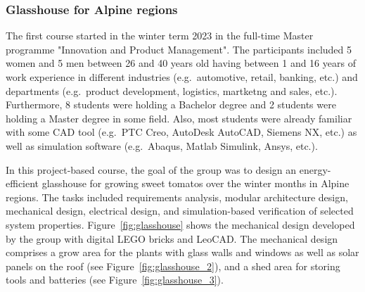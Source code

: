 \documentclass{PDS}
\begin{document}
\subsubsection{Glasshouse for Alpine regions}
\label{sec:master-product-lego}

The first course started in the winter term 2023 in the full-time Master programme "Innovation and Product Management".
The participants included 5 women and 5 men between 26 and 40 years old having between 1 and 16 years of work experience in different industries (e.g.\ automotive, retail, banking, etc.) and departments (e.g.\ product development, logistics, martketng and sales, etc.).
Furthermore, 8 students were holding a Bachelor degree and 2 students were holding a Master degree in some field.
Also, most students were already familiar with some CAD tool (e.g.\ PTC Creo, AutoDesk AutoCAD, Siemens NX, etc.) as well as simulation software (e.g.\ Abaqus, Matlab Simulink, Ansys, etc.).

In this project-based course, the goal of the group was to design an energy-efficient glasshouse for growing sweet tomatos over the winter months in Alpine regions.
The tasks included requirements analysis, modular architecture design, mechanical design, electrical design, and simulation-based verification of selected system properties.
Figure~\ref{fig:glasshouse} shows the mechanical design developed by the group with digital LEGO bricks and LeoCAD.
The mechanical design comprises a grow area for the plants with glass walls and windows as well as solar panels on the roof (see Figure~\ref{fig:glasshouse_2}), and a shed area for storing tools and batteries (see Figure~\ref{fig:glasshouse_3}).
\end{document}
